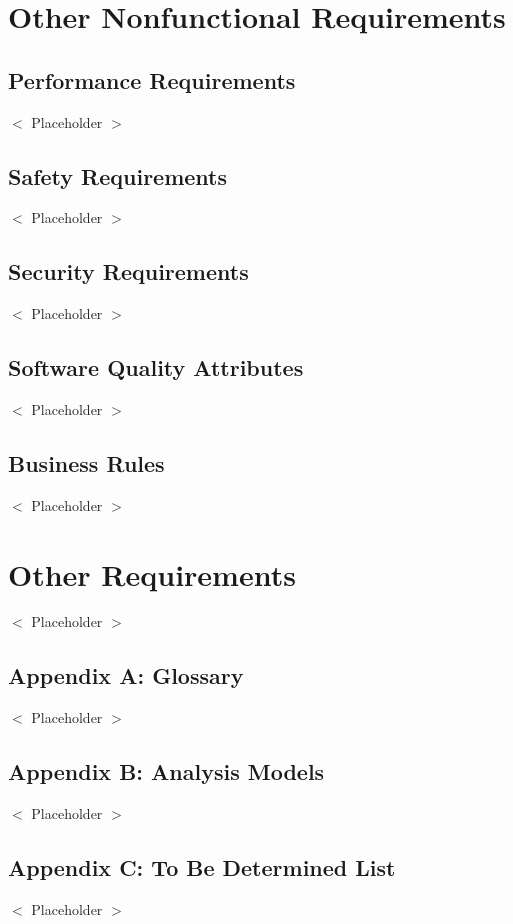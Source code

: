 \documentclass{scrreprt}
\begin{document}

\chapter{Other Nonfunctional Requirements}

\section{Performance Requirements}
$<$ Placeholder $>$

\section{Safety Requirements}
$<$ Placeholder $>$

\section{Security Requirements}
$<$ Placeholder $>$

\section{Software Quality Attributes}
$<$ Placeholder $>$

\section{Business Rules}
$<$ Placeholder $>$


\chapter{Other Requirements}
$<$ Placeholder $>$

\section{Appendix A: Glossary}
$<$ Placeholder $>$

\section{Appendix B: Analysis Models}
$<$ Placeholder $>$

\section{Appendix C: To Be Determined List}
$<$ Placeholder $>$
\end{document}
